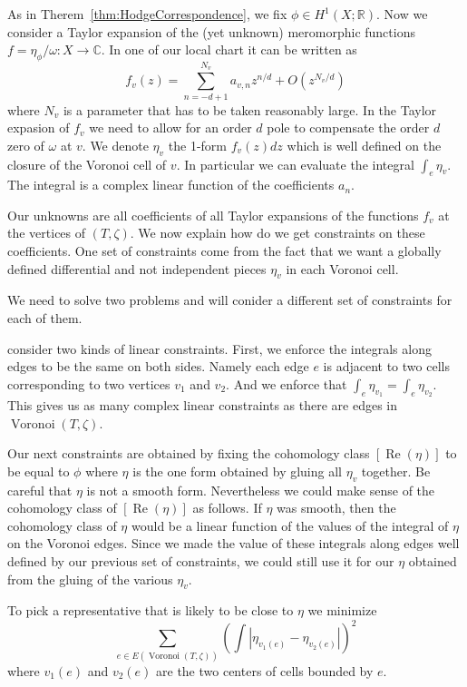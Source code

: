 \documentclass[a4paper,12pt]{article}
\def\bC{\mathbb{C}}
\def\bR{\mathbb{R}}
\def\Re{\operatorname{Re}}
\def\Voronoi{\operatorname{Voronoi}}
\begin{document}
As in Therem~\ref{thm:HodgeCorrespondence}, we fix $\phi \in H^1(X; \bR)$. Now we consider
a Taylor expansion of the (yet unknown) meromorphic functions
$f = \eta_\phi / \omega: X \to \bC$. In one of our local chart it can be written as
\begin{equation}
f_v(z) = \sum_{n = -d + 1}^{N_v} a_{v,n} z^{n/d} + O(z^{N_v/d})
\end{equation}
where $N_v$ is a parameter that has to be taken reasonably large. In the Taylor
expasion of $f_v$ we need to allow for an order $d$ pole to compensate the
order $d$ zero of $\omega$ at $v$. We denote $\eta_v$ the 1-form $f_v(z) dz$
which is well defined on the closure of the Voronoi cell of $v$. In particular
we can evaluate the integral $\int_e \eta_v$. The integral is a complex linear
function of the coefficients $a_n$.

Our unknowns are all coefficients of all Taylor expansions of the functions
$f_v$ at the vertices of $(T, \zeta)$. We now explain how do we get constraints
on these coefficients. One set of constraints come from the fact that we want
a globally defined differential and not independent pieces $\eta_v$ in each
Voronoi cell.

We need to solve two problems and will conider a different
set of constraints for each of them.

consider two kinds of linear constraints. First,
we enforce the integrals along edges to be the same on both sides. Namely
each edge $e$ is adjacent to two cells corresponding to two vertices $v_1$
and $v_2$. And we enforce that $\int_e \eta_{v_1} = \int_e \eta_{v_2}$.
This gives us as many complex linear constraints as there are edges
in $\Voronoi(T, \zeta)$.

Our next constraints are obtained by fixing the cohomology class
$[\Re(\eta)]$ to be equal to $\phi$ where $\eta$ is the one form
obtained by gluing all $\eta_v$ together. Be careful that $\eta$ is
not a smooth form. Nevertheless we could make sense of the cohomology
class of $[\Re(\eta)]$ as follows. If $\eta$ was smooth, then the 
cohomology class of $\eta$ would be a linear function of the values
of the integral of $\eta$ on the Voronoi edges. Since we made the
value of these integrals along edges well defined by our previous
set of constraints, we could still use it for our $\eta$ obtained
from the gluing of the various $\eta_v$.

To pick a representative that is likely to be close to $\eta$ we
minimize
\begin{equation}
\label{eq:quadraticObjective}
\sum_{e \in E(\Voronoi(T,\zeta))} \left(\int |\eta_{v_1(e)} - \eta_{v_2(e)}|\right)^2
\end{equation}
where $v_1(e)$ and $v_2(e)$ are the two centers of cells bounded by $e$.
\end{document}
